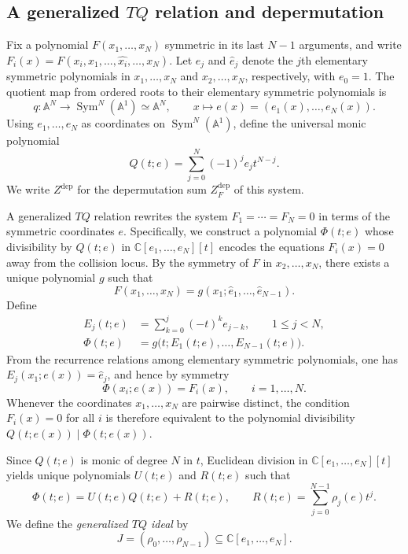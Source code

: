 \documentclass[11pt]{article}
\theoremstyle{definition}
\newcommand{\A}{\mathbb{A}}
\newcommand{\C}{\mathbb{C}}
\newcommand{\Sym}{\operatorname{Sym}}
\begin{document}
\subsection{A generalized \texorpdfstring{$TQ$}{TQ} relation and depermutation}
\label{sec:general-tq}

Fix a polynomial $F(x_1,\ldots,x_N)$ symmetric in its last $N-1$ arguments, and write
$F_i(x)=F(x_i,x_1,\ldots,\widehat{x_i},\ldots,x_N)$.
Let $e_j$ and $\hat{e}_j$ denote the $j$th elementary symmetric polynomials
in $x_1,\ldots,x_N$ and $x_2,\ldots,x_N$, respectively, with $e_0=1$.
The quotient map from ordered roots to their elementary symmetric polynomials is
\[
q:\A^N\longrightarrow\Sym^N(\A^1)\simeq\A^N,
\qquad x\longmapsto e(x)=(e_1(x),\ldots,e_N(x)).
\]
Using $e_1,\ldots,e_N$ as coordinates on $\Sym^N(\A^1)$, define the universal monic polynomial
\[
Q(t;e)=\sum_{j=0}^N(-1)^j e_j t^{N-j}.
\]
We write $Z^{\mathrm{dep}}$ for the depermutation sum $Z^{\mathrm{dep}}_F$ of this system.

A generalized $TQ$ relation rewrites the system $F_1=\cdots=F_N=0$ in terms of the symmetric coordinates $e$. Specifically, we construct a polynomial
$\Phi(t;e)$ whose divisibility by $Q(t;e)$ in $\C[e_1,\ldots,e_N][t]$
encodes the equations $F_i(x)=0$ away from the collision locus. By the symmetry of $F$ in $x_2,\ldots,x_N$, there exists a unique
polynomial $g$ such that
\[
F(x_1,\ldots,x_N)=g(x_1;\hat{e}_1,\ldots,\hat{e}_{N-1}).
\]
Define
\begin{align*}
	E_j(t;e)&=\sum_{k=0}^j(-t)^k e_{j-k},\qquad 1\le j<N,\\
	\Phi(t;e)&=g\bigl(t;E_1(t;e),\ldots,E_{N-1}(t;e)\bigr).
\end{align*}
From the recurrence relations among elementary symmetric polynomials, one has
$E_j(x_1;e(x))=\hat{e}_j$, and hence by symmetry
\[
\Phi(x_i;e(x))=F_i(x),\qquad i=1,\ldots,N.
\]
Whenever the coordinates $x_1,\ldots,x_N$ are pairwise distinct, the condition $F_i(x)=0$ for all $i$ is therefore equivalent to the polynomial divisibility $Q(t;e(x))\mid\Phi(t;e(x))$.

Since $Q(t;e)$ is monic of degree $N$ in $t$, Euclidean division in $\C[e_1,\ldots,e_N][t]$ yields unique polynomials $U(t;e)$ and $R(t;e)$ such that
\begin{equation}\label{eq:general-tq-division}
	\Phi(t;e)=U(t;e)Q(t;e)+R(t;e),\qquad
	R(t;e)=\sum_{j=0}^{N-1}\rho_j(e)t^j.
\end{equation}
We define the \emph{generalized $TQ$ ideal} by
\begin{equation}\label{eq:general-tq-ideal}
	J=(\rho_0,\ldots,\rho_{N-1})\subseteq\C[e_1,\ldots,e_N].
\end{equation}
\end{document}

